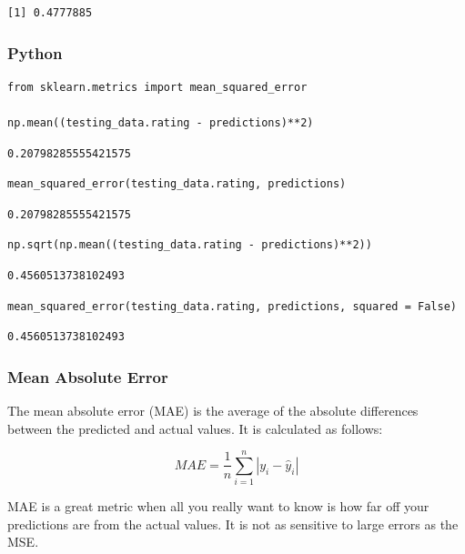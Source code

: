 \documentclass[
  letterpaper,
]{krantz}
\begin{document}
\begin{verbatim}
[1] 0.4777885
\end{verbatim}

\subsubsection{Python}

\begin{verbatim}
from sklearn.metrics import mean_squared_error

np.mean((testing_data.rating - predictions)**2)
\end{verbatim}

\begin{verbatim}
0.20798285555421575
\end{verbatim}

\begin{verbatim}
mean_squared_error(testing_data.rating, predictions)
\end{verbatim}

\begin{verbatim}
0.20798285555421575
\end{verbatim}

\begin{verbatim}
np.sqrt(np.mean((testing_data.rating - predictions)**2))
\end{verbatim}

\begin{verbatim}
0.4560513738102493
\end{verbatim}

\begin{verbatim}
mean_squared_error(testing_data.rating, predictions, squared = False)
\end{verbatim}

\begin{verbatim}
0.4560513738102493
\end{verbatim}

\subsubsection{Mean Absolute Error}\label{sec-knowing-metrics-mae}

The mean absolute error (MAE) is the average of the absolute differences
between the predicted and actual values. It is calculated as follows:

\[MAE = \frac{1}{n}\sum_{i=1}^{n}|y_i - \hat{y}_i|\]

MAE is a great metric when all you really want to know is how far off
your predictions are from the actual values. It is not as sensitive to
large errors as the MSE.
\end{document}
